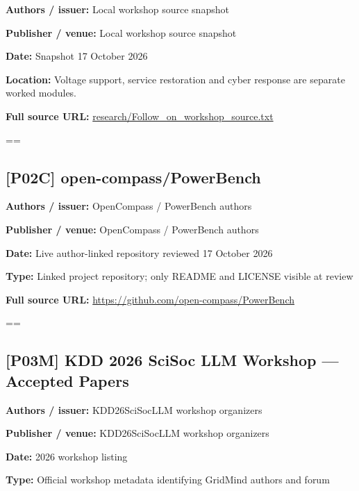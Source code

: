 \documentclass[10pt,letterpaper]{article}
\begin{document}
\textbf{Authors / issuer:} Local workshop source snapshot\par
\textbf{Publisher / venue:} Local workshop source snapshot\par
\textbf{Date:} Snapshot 17 October 2026\par
\textbf{Location:} Voltage support, service restoration and cyber response are separate worked modules.\par
\textbf{Full source URL:} \href{../research/Follow_on_workshop_source.txt}{\small\ttfamily research/\allowbreak{}Follow\_\allowbreak{}on\_\allowbreak{}workshop\_\allowbreak{}source.\allowbreak{}txt}\par
\egroup\par\noindent\box\readingEntry\par\medskip
\setbox\readingEntry=\vbox\bgroup\hsize=\linewidth\subsection*{[P02C] open-compass/PowerBench}
\textbf{Authors / issuer:} OpenCompass / PowerBench authors\par
\textbf{Publisher / venue:} OpenCompass / PowerBench authors\par
\textbf{Date:} Live author-linked repository reviewed 17 October 2026\par
\textbf{Type:} Linked project repository; only README and LICENSE visible at review\par
\textbf{Full source URL:} \href{https://github.com/open-compass/PowerBench}{\small\ttfamily https:/\allowbreak{}/\allowbreak{}github.\allowbreak{}com/\allowbreak{}open-\allowbreak{}compass/\allowbreak{}PowerBench}\par
\egroup\par\noindent\box\readingEntry\par\medskip
\setbox\readingEntry=\vbox\bgroup\hsize=\linewidth\subsection*{[P03M] KDD 2026 SciSoc LLM Workshop --- Accepted Papers}
\textbf{Authors / issuer:} KDD26SciSocLLM workshop organizers\par
\textbf{Publisher / venue:} KDD26SciSocLLM workshop organizers\par
\textbf{Date:} 2026 workshop listing\par
\textbf{Type:} Official workshop metadata identifying GridMind authors and forum\par
\end{document}

